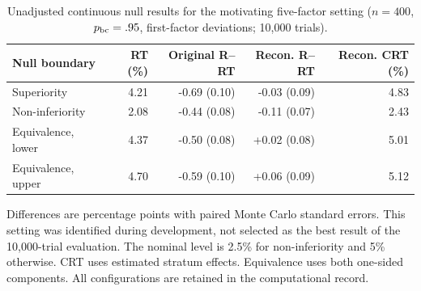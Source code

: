 \documentclass[12pt,a4paper]{article}
\theoremstyle{definition}
\theoremstyle{remark}\newtheorem{remark}{Remark}
\numberwithin{equation}{section}
\begin{document}
\begin{table}[!htbp]\centering
\caption{Unadjusted continuous null results for the motivating five-factor setting ($n=400$, $p_{\rm bc}=.95$, first-factor deviations; 10,000 trials).}
\label{tab:supp-pilot-target}
\begin{threeparttable}\small
\begin{tabular}{@{}lrrrr@{}}
\toprule
Null boundary & RT (\%) & Original R--RT & Recon. R--RT & Recon. CRT (\%)\\
\midrule
Superiority & 4.21 & -0.69 (0.10) & -0.03 (0.09) & 4.83\\
Non-inferiority & 2.08 & -0.44 (0.08) & -0.11 (0.07) & 2.43\\
Equivalence, lower & 4.37 & -0.50 (0.08) & +0.02 (0.08) & 5.01\\
Equivalence, upper & 4.70 & -0.59 (0.10) & +0.06 (0.09) & 5.12\\
\bottomrule\end{tabular}
\begin{tablenotes}[flushleft]\small
\item[] Differences are percentage points with paired Monte Carlo standard errors. This setting was identified during development, not selected as the best result of the 10,000-trial evaluation. The nominal level is 2.5\% for non-inferiority and 5\% otherwise. CRT uses estimated stratum effects. Equivalence uses both one-sided components. All configurations are retained in the computational record.
\end{tablenotes}\end{threeparttable}\end{table}
\end{document}
